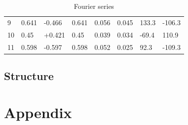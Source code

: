 \documentclass[12pt, a4paper]{article}
\begin{document}
\begin{table}[H]
\begin{tabular}{@{}llllllll@{}}
        9       & 0.641                                    & -0.466                                    & 0.641                 & 0.056                            & 0.045     & 133.3                         & -106.3                       \\
        10      & 0.45                                     & +0.421                                    & 0.45                  & 0.039                            & 0.034     & -69.4                         & 110.9                        \\
        11      & 0.598                                    & -0.597                                    & 0.598                 & 0.052                            & 0.025     & 92.3                          & -109.3                       \\ \bottomrule
    \end{tabular}
    \caption{Fourier series}\label{tab::fourier}
\end{table}
\subsection{Structure}
\lipsum[35]
\newpage

\renewcommand{\thesubsection}{\Alph{subsection}}
\setcounter{page}{\value{lastroman}}
\section*{Appendix}


\newpage


\newpage
\listoffigures
\listoftables





\end{document}
